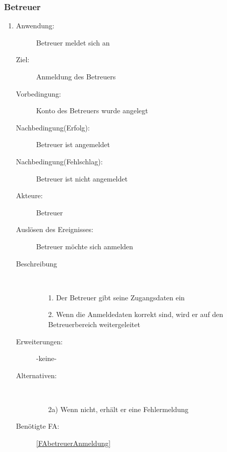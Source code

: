 \documentclass[parskip=full]{scrartcl}
\newcommand{\swtLabel}[1]{\textbf{/#1\arabic*0/}}
\begin{document}
\subsubsection{Betreuer}
\begin{enumerate} [label=\swtLabel{B}]
  \item \label{UCbetreuerAnmeldung}
	 \begin{description}
		\item[Anwendung:] Betreuer meldet sich an
  		\item[Ziel:] Anmeldung des Betreuers
  		\item[Vorbedingung:] Konto des Betreuers wurde angelegt
  		\item[Nachbedingung(Erfolg):] Betreuer ist angemeldet
  		\item[Nachbedingung(Fehlschlag):] Betreuer ist nicht angemeldet
  		\item[Akteure:] Betreuer
  		\item[Auslösen des Ereignisses:] Betreuer möchte sich anmelden
  		\item[Beschreibung]~
  		\begin{enumerate}
  			\item[1.] Der Betreuer gibt seine Zugangsdaten ein
  			\item[2.] Wenn die Anmeldedaten korrekt sind, wird er auf den
  			Betreuerbereich weitergeleitet
  		\end{enumerate}
  		\item[Erweiterungen:] -keine-
  		\item[Alternativen:] ~
  		\begin{enumerate}
  		  \item[2a)] Wenn nicht, erhält er eine Fehlermeldung
  		\end{enumerate}  
  		\item[Benötigte FA:] \ref{FAbetreuerAnmeldung}
  	\end{description}
   

\end{enumerate}
\end{document}
